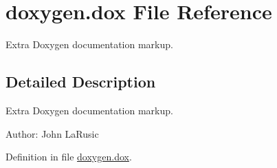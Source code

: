 \hypertarget{doxygen_8dox}{
\section{doxygen.dox File Reference}
\label{doxygen_8dox}
}
Extra Doxygen documentation markup. 



\subsection{Detailed Description}
Extra Doxygen documentation markup. 

\begin{Desc}
\item[Author:]John LaRusic \end{Desc}


Definition in file \hyperlink{doxygen_8dox-source}{doxygen.dox}.